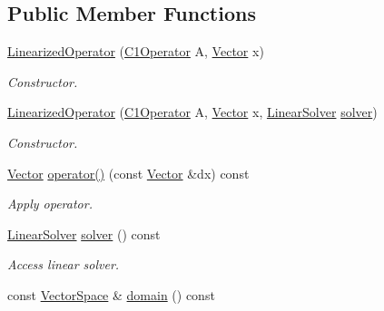 \subsection*{Public Member Functions}
\begin{DoxyCompactItemize}
\item 
\hyperlink{classSpacy_1_1LinearizedOperator_a4abd53567430614653c56cc29a6fcde0_a4abd53567430614653c56cc29a6fcde0}{Linearized\+Operator} (\hyperlink{group__SpacyGroup_ga87ae8cb0d7a567a4bb181e0a9f182620_ga87ae8cb0d7a567a4bb181e0a9f182620}{C1\+Operator} A, \hyperlink{classSpacy_1_1Vector}{Vector} x)
\begin{DoxyCompactList}\small\item\em Constructor. \end{DoxyCompactList}\item 
\hyperlink{classSpacy_1_1LinearizedOperator_ab0141d921ce22831128dd1f2a5a89eda_ab0141d921ce22831128dd1f2a5a89eda}{Linearized\+Operator} (\hyperlink{group__SpacyGroup_ga87ae8cb0d7a567a4bb181e0a9f182620_ga87ae8cb0d7a567a4bb181e0a9f182620}{C1\+Operator} A, \hyperlink{classSpacy_1_1Vector}{Vector} x, \hyperlink{namespaceSpacy_a7d5cd1c6fb9dd85aa345b536caf30bba_a7d5cd1c6fb9dd85aa345b536caf30bba}{Linear\+Solver} \hyperlink{classSpacy_1_1LinearizedOperator_a8e26eebdf3236200c738ab76eed5d3d6_a8e26eebdf3236200c738ab76eed5d3d6}{solver})
\begin{DoxyCompactList}\small\item\em Constructor. \end{DoxyCompactList}\item 
\hyperlink{classSpacy_1_1Vector}{Vector} \hyperlink{classSpacy_1_1LinearizedOperator_a9cbed75d8eee66210769d385d4a31ef0_a9cbed75d8eee66210769d385d4a31ef0}{operator()} (const \hyperlink{classSpacy_1_1Vector}{Vector} \&dx) const 
\begin{DoxyCompactList}\small\item\em Apply operator. \end{DoxyCompactList}\item 
\hyperlink{namespaceSpacy_a7d5cd1c6fb9dd85aa345b536caf30bba_a7d5cd1c6fb9dd85aa345b536caf30bba}{Linear\+Solver} \hyperlink{classSpacy_1_1LinearizedOperator_a8e26eebdf3236200c738ab76eed5d3d6_a8e26eebdf3236200c738ab76eed5d3d6}{solver} () const 
\begin{DoxyCompactList}\small\item\em Access linear solver. \end{DoxyCompactList}\item 
const \hyperlink{classSpacy_1_1VectorSpace}{Vector\+Space} \& \hyperlink{classSpacy_1_1OperatorBase_a2588f9b3e0188820c4c494e63293dc6f_a2588f9b3e0188820c4c494e63293dc6f}{domain} () const 

\end{DoxyCompactItemize}

